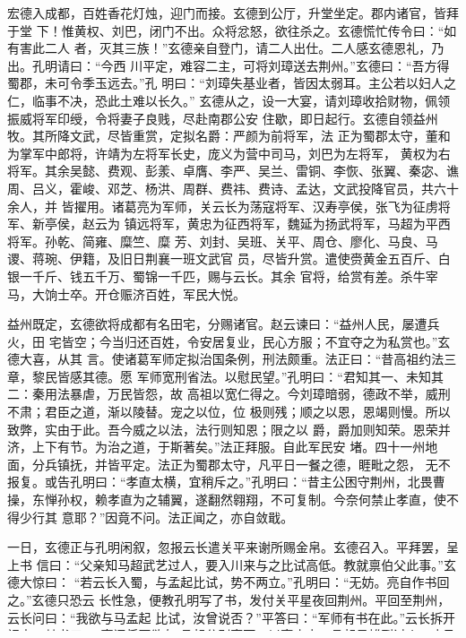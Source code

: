 宏德入成都，百姓香花灯烛，迎门而接。玄德到公厅，升堂坐定。郡内诸官，皆拜于堂
下！惟黄权、刘巴，闭门不出。众将忿怒，欲往杀之。玄德慌忙传令曰：“如有害此二人
者，灭其三族！”玄德亲自登门，请二人出仕。二人感玄德恩礼，乃出。孔明请曰：“今西
川平定，难容二主，可将刘璋送去荆州。”玄德曰：“吾方得蜀郡，未可令季玉远去。”孔
明曰：“刘璋失基业者，皆因太弱耳。主公若以妇人之仁，临事不决，恐此土难以长久。”
玄德从之，设一大宴，请刘璋收拾财物，佩领振威将军印绶，令将妻子良贱，尽赴南郡公安
住歇，即日起行。玄德自领益州牧。其所降文武，尽皆重赏，定拟名爵：严颜为前将军，法
正为蜀郡太守，董和为掌军中郎将，许靖为左将军长史，庞义为营中司马，刘巴为左将军，
黄权为右将军。其余吴懿、费观、彭羕、卓膺、李严、吴兰、雷铜、李恢、张翼、秦宓、谯
周、吕义，霍峻、邓芝、杨洪、周群、费祎、费诗、孟达，文武投降官员，共六十余人，并
皆擢用。诸葛亮为军师，关云长为荡寇将军、汉寿亭侯，张飞为征虏将军、新亭侯，赵云为
镇远将军，黄忠为征西将军，魏延为扬武将军，马超为平西将军。孙乾、简雍、糜竺、糜
芳、刘封、吴班、关平、周仓、廖化、马良、马谡、蒋琬、伊籍，及旧日荆襄一班文武官
员，尽皆升赏。遣使赍黄金五百斤、白银一千斤、钱五千万、蜀锦一千匹，赐与云长。其余
官将，给赏有差。杀牛宰马，大饷士卒。开仓赈济百姓，军民大悦。

益州既定，玄德欲将成都有名田宅，分赐诸官。赵云谏曰：“益州人民，屡遭兵火，田
宅皆空；今当归还百姓，令安居复业，民心方服；不宜夺之为私赏也。”玄德大喜，从其
言。使诸葛军师定拟治国条例，刑法颇重。法正曰：“昔高祖约法三章，黎民皆感其德。愿
军师宽刑省法。以慰民望。”孔明曰：“君知其一、未知其二：秦用法暴虐，万民皆怨，故
高祖以宽仁得之。今刘璋暗弱，德政不举，威刑不肃；君臣之道，渐以陵替。宠之以位，位
极则残；顺之以恩，恩竭则慢。所以致弊，实由于此。吾今威之以法，法行则知恩；限之以
爵，爵加则知荣。恩荣并济，上下有节。为治之道，于斯著矣。”法正拜服。自此军民安
堵。四十一州地面，分兵镇抚，并皆平定。法正为蜀郡太守，凡平日一餐之德，睚毗之怨，
无不报复。或告孔明曰：“孝直太横，宜稍斥之。”孔明曰：“昔主公困守荆州，北畏曹
操，东惮孙权，赖孝直为之辅翼，遂翻然翱翔，不可复制。今奈何禁止孝直，使不得少行其
意耶？”因竟不问。法正闻之，亦自敛戢。

一日，玄德正与孔明闲叙，忽报云长遣关平来谢所赐金帛。玄德召入。平拜罢，呈上书
信曰：“父亲知马超武艺过人，要入川来与之比试高低。教就禀伯父此事。”玄德大惊曰：
“若云长入蜀，与孟起比试，势不两立。”孔明曰：“无妨。亮自作书回之。”玄德只恐云
长性急，便教孔明写了书，发付关平星夜回荆州。平回至荆州，云长问曰：“我欲与马孟起
比试，汝曾说否？”平答曰：“军师有书在此。”云长拆开视之。其书曰：“亮闻将军欲与
孟起分别高下。以亮度之：孟起虽雄烈过人，亦乃黥布、彭越之徒耳；当与翼德并驱争先，
犹未及美髯公之绝伦超群也。今公受任守荆州，不为不重；倘一入川，若荆州有失。罪莫大
焉。惟冀明照。”云长看毕，自绰其髯笑曰：“孔明知我心也。”将书遍示宾客，遂无入川
之意。

却说东吴孙权，知玄德并吞西川，将刘璋逐于公安，遂召张昭、顾雍商议曰：“当初刘
备借我荆州时，说取了西川，便还荆州。今已得巴蜀四十一州，须用取索汉上诸郡。如其不
还，即动干戈。”张昭曰：“吴中方宁，不可动兵。昭有一计，使刘备将荆州双手奉还主
公。”正是：西蜀方开新日月，东吴又索旧山川。未知其计如何，且看下文分解。